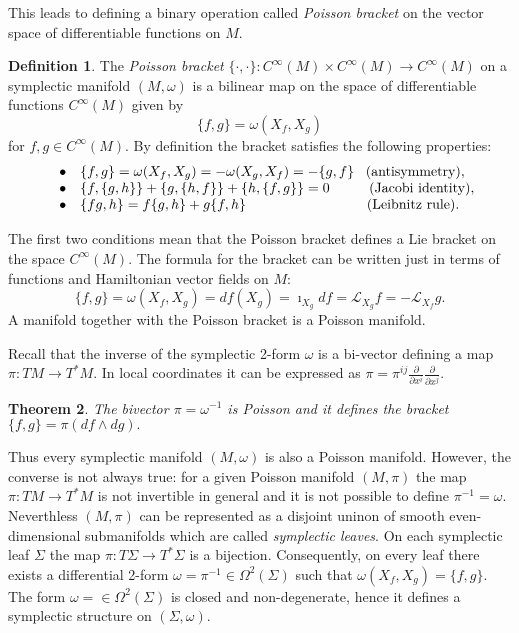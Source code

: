 \documentclass[11pt]{report}
\theoremstyle{plain}
\newtheorem{thm}{Theorem}[section]
\theoremstyle{definition}
\newtheorem{defn}[thm]{Definition}
\theoremstyle{remark}
\theoremstyle{remark}
\numberwithin{equation}{section}
\begin{document}
This leads to defining a binary operation called \textit{Poisson bracket} on the vector space of differentiable functions on $M$. 

\begin{defn}
The \textit{Poisson bracket} $\{\cdot, \cdot \}: C^\infty(M)\times C^\infty(M) \to C^\infty(M)$ on a symplectic manifold $(M,\omega)$ is a bilinear map on the space of differentiable functions $C^\infty(M)$ given by 
\begin{equation}
\{ f, g \} = \omega(X_f, X_g)
\end{equation}
for $f, g \in C^\infty(M)$. By definition the bracket satisfies the following properties:
\[\begin{array}{lcl}
 &\bullet& \{ f, g \} = \omega(X_f, X_g) = -\omega(X_g, X_f) = -\{ g, f \} \, \, \, \,\, {\rm (antisymmetry)},\\
 &\bullet& \{ f, \{g,h\} \} + \{ g, \{h,f\} \} + \{ h, \{f,g\} \} = 0 \,\,\,\,\, \,\,\, \, \, \,  \, \, \, \, \, \, {\rm (Jacobi \, \, identity)},\\
 &\bullet& \{ fg, h \} = f \{ g, h \} + g\{ f, h \}  \, \, \, \, \, \, \,\,\, \, \,  \, \, \, \, \, \, \, \,  \, \, \, \, \, \, \, \, \, \, \, \, \, \, \, \, \, \, \, \, \, \, \, \, \, \, \, \, \,  \, \, \, \,{\rm (Leibnitz \, \, rule)}.\\
\end{array}\]
\end{defn}

The first two conditions mean that the Poisson bracket defines a Lie bracket on the space $C^\infty(M)$. 
The formula for the bracket can be written just in terms of functions and Hamiltonian vector fields on $M$:
$$
\{ f, g \} = \omega(X_f, X_g) = df(X_g) = \imath_{X_g}df = \mathcal{L}_{X_g}f = - \mathcal{L}_{X_f}g.
$$
A manifold together with the Poisson bracket is a Poisson manifold.

Recall that the inverse of the symplectic 2-form $\omega$ is a bi-vector defining a map $\pi: TM \to T^*M$. In local coordinates it can be expressed as $\pi = \pi^{ij}\frac{\partial}{\partial x^i}\frac{\partial}{\partial x^j}$.
 
 
 \begin{thm}
 The bivector $\pi=\omega^{-1}$ is Poisson and it defines the bracket $\{ f, g \} = \pi (df \wedge dg).$
 \end{thm}
 
 Thus every symplectic manifold $(M,\omega)$ is also a Poisson manifold. However, the converse is not always true: for a given Poisson manifold $(M,\pi)$ the map $\pi: TM \to T^*M$ is not invertible in general and it is not possible to define $\pi^{-1} = \omega$. 
 Neverthless $(M,\pi)$ can be represented as a disjoint uninon of smooth even-dimensional submanifolds which are called \textit{symplectic leaves}. On each symplectic leaf $\Sigma$ the map $\pi: T\Sigma \to T^*\Sigma$ is a bijection. Consequently, on every leaf there exists a differential 2-form $\omega = \pi^{-1}\in \Omega^2(\Sigma)$ such that $\omega(X_f, X_g) = \{ f, g \}$. The form $\omega = \in \Omega^2(\Sigma)$ is closed and non-degenerate, hence it defines a symplectic structure on $(\Sigma, \omega)$. 
 
\end{document}
